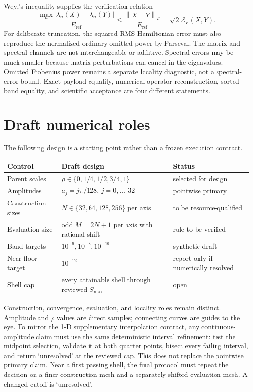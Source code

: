 \documentclass[11pt]{article}
\newcommand{\norm}[1]{\left\lVert #1\right\rVert}
\begin{document}
Weyl's inequality supplies the verification relation
\begin{equation}
 \frac{\max_n|\lambda_n(X)-\lambda_n(Y)|}{E_{\mathrm{ref}}}
 \le\frac{\norm{X-Y}_F}{E_{\mathrm{ref}}}
 =\sqrt{2}\,\mathcal E_F(X,Y).
\end{equation}
For deliberate truncation, the squared RMS Hamiltonian error must also reproduce
the normalized ordinary omitted power by Parseval.
The matrix and spectral channels are not interchangeable or additive. Spectral errors
may be much smaller because matrix perturbations can cancel in the eigenvalues. Omitted
Frobenius power remains a separate locality diagnostic, not a spectral-error bound.
Exact payload equality, numerical operator reconstruction, sorted-band equality, and
scientific acceptance are four different statements.

\section{Draft numerical roles}

The following design is a starting point rather than a frozen execution contract.

\begin{table}[htbp]
\centering
\begin{tabular}{p{}p{}p{}}
\toprule
Control & Draft design & Status\\
\midrule
Parent scales & $\rho\in\{0,1/4,1/2,3/4,1\}$ & selected for design\\
Amplitudes & $a_j=j\pi/128$, $j=0,\ldots,32$ & pointwise primary\\
Construction sizes & $N\in\{32,64,128,256\}$ per axis & to be resource-qualified\\
Evaluation size & odd $M=2N+1$ per axis with rational shift & rule to be verified\\
Band targets & $10^{-6},10^{-8},10^{-10}$ & synthetic draft\\
Near-floor target & $10^{-12}$ & report only if numerically resolved\\
Shell cap & every attainable shell through reviewed $S_{\max}$ & open\\
\bottomrule
\end{tabular}
\end{table}

Construction, convergence, evaluation, and locality roles remain distinct. Amplitude and
$\rho$ values are direct samples; connecting curves are guides to the eye. To mirror the
1-D supplementary interpolation contract, any continuous-amplitude claim must use the
same deterministic interval refinement: test the midpoint selection, validate it at both
quarter points, bisect every failing interval, and return `unresolved' at the reviewed
cap. This does not replace the pointwise primary claim. Near a first passing shell, the
final protocol must repeat the decision on a finer construction mesh
and a separately shifted evaluation mesh. A changed cutoff is `unresolved'.
\end{document}
